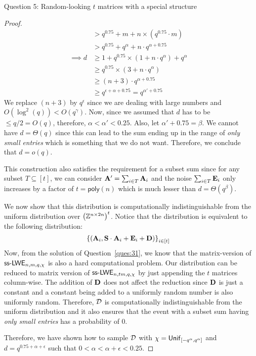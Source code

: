 \begin{solution}{Question 5: Random-looking $t$ matrices with a special structure}
\begin{proof}
\begin{equation}
\begin{split}
                           &> q^{0.75} + m + n\times\left(q^{0.75}\cdot m\right)\\
                           &> q^{0.75} + q^\alpha + n\cdot q^{\alpha + 0.75}\\
                \implies d &\geq 1 + q^{0.75}\times(1 + n\cdot q^\alpha) + q^\alpha\\
                           &\geq q^{0.75}\times(3 + n\cdot q^\alpha)\\
                           &\geq (n + 3)\cdot q^{\alpha + 0.75}\\
                           &\geq q^{\epsilon + \alpha + 0.75} = q^{\alpha' + 0.75}
            \end{split}
        \end{equation}
        We replace $(n + 3)$ by $q^\epsilon$ since we are dealing with large numbers and $O(\log^2(q)) < O(q^\gamma)$. Now, since we assumed that $d$ has to be $\leq q/2 = O(q)$, therefore, $\alpha < \alpha' < 0.25$. Also, let $\alpha' + 0.75 = \beta$. We cannot have $d = \Theta(q)$ since this can lead to the sum ending up in the range of \textit{only small entries} which is something that we do not want. Therefore, we conclude that $d = o(q)$.\par
        This construction also satisfies the requirement for a subset sum since for any subset $T\subseteq [t]$, we can consider $\mathbf{A}' = \sum_{i\in T}\mathbf{A}_i$ and the noise $\sum_{i\in T}\mathbf{E}_i$ only increases by a factor of $t = \mathsf{poly}(n)$ which is much lesser than $d = \Theta(q^\beta)$.\par
        We now show that this distribution is computationally indistinguishable from the uniform distribution over $\left(\mathbb{Z}^{n\times 2n}\right)^t$. Notice that the distribution is equivalent to the following distribution:
        \begin{equation}
            \left\{\left(\mathbf{A}_i, \mathbf{S}\cdot\mathbf{A}_i + \mathbf{E}_i + \mathbf{D}\right)\right\}_{i\in [t]}
        \end{equation}
        Now, from the solution of Question~\ref{ques:31}, we know that the matrix-version of $\mathsf{ss\text{-}LWE}_{n,m,q,\chi}$ is also a hard computational problem. Our distribution can be reduced to matrix version of $\mathsf{ss\text{-}LWE}_{n,tm,q,\chi}$ by just appending the $t$ matrices column-wise. The addition of $\mathbf{D}$ does not affect the reduction since $\mathbf{D}$ is just a constant and a constant being added to a uniformly random number is also uniformly random. Therefore, $\mathcal{D}$ is computationally indistinguishable from the uniform distribution and it also ensures that the event with a subset sum having \textit{only small entries} has a probability of $0$.\par
        Therefore, we have shown how to sample $\mathcal{D}$ with $\chi = \mathsf{Unif}_{\left[-q^\alpha, q^\alpha\right]}$ and $d = q^{0.75+\alpha+\epsilon}$ such that $0 < \alpha < \alpha + \epsilon < 0.25$.
    \end{proof}
\end{solution}
